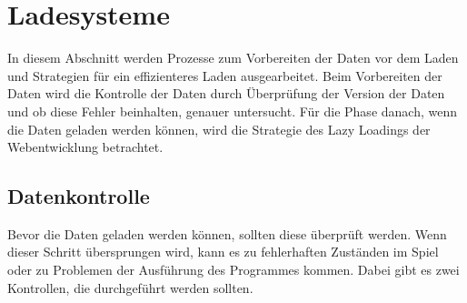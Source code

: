 \section{Ladesysteme}\label{sect:ladesysteme}
In diesem Abschnitt werden Prozesse zum Vorbereiten der Daten vor dem Laden und Strategien für ein effizienteres Laden ausgearbeitet. Beim Vorbereiten der Daten wird die Kontrolle der Daten durch Überprüfung der Version der Daten und ob diese Fehler beinhalten, genauer untersucht. Für die Phase danach, wenn die Daten geladen werden können, wird die Strategie des Lazy Loadings der Webentwicklung betrachtet.



\subsection{Datenkontrolle}
Bevor die Daten geladen werden können, sollten diese überprüft werden. Wenn dieser Schritt übersprungen wird, kann es zu fehlerhaften Zuständen im Spiel oder zu Problemen der Ausführung des Programmes kommen. Dabei gibt es zwei Kontrollen, die durchgeführt werden sollten.

